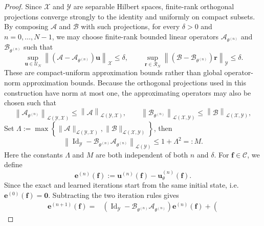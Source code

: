 \documentclass[10pt,a4paper]{amsart}
\begin{document}
\begin{proof}
				{ Since $\mathcal X$ and $\mathcal Y$ are separable Hilbert spaces,
					finite-rank orthogonal projections converge strongly to the identity and
					uniformly on compact subsets. By composing $\mathcal A$ and $\mathcal B$
					with such projections, for every $\delta>0$ and
					$n=0,\ldots,N-1$, we may choose finite-rank bounded linear operators
					$\mathcal A_{\theta^{(n)}}$ and
					$\mathcal B_{\theta^{(n)}}$ such that
					\[
					\sup_{\boldsymbol u\in\mathcal U_N}
					\left\|
					\left(
					\mathcal A-\mathcal A_{\theta^{(n)}}
					\right)\boldsymbol u
					\right\|_{\mathcal X}
					\leq\delta, \qquad
					\sup_{\boldsymbol r\in\mathcal R_N}
					\left\|
					\left(
					\mathcal B-\mathcal B_{\theta^{(n)}}
					\right)\boldsymbol r
					\right\|_{\mathcal Y}
					\leq\delta.
					\]
					These are compact-uniform approximation bounds rather than global
					operator-norm approximation bounds. }
				Because the orthogonal projections used in this construction have norm at
				most one, the approximating operators may also be chosen such that
				\[
				\left\|
				\mathcal A_{\theta^{(n)}}
				\right\|_{\mathcal L(\mathcal Y,\mathcal X)}
				\leq \left\|
				\mathcal A
				\right\|_{\mathcal L(\mathcal Y,\mathcal X)},
				\qquad
				\left\|
				\mathcal B_{\theta^{(n)}}
				\right\|_{\mathcal L(\mathcal X,\mathcal Y)}
				\leq \left\|
				\mathcal B
				\right\|_{\mathcal L(\mathcal X,\mathcal Y)},
				\]
				Set $\Lambda
				:=
				\max
				\left\{
				\|\mathcal A\|_{\mathcal L(\mathcal Y,\mathcal X)},
				\|\mathcal B\|_{\mathcal L(\mathcal X,\mathcal Y)}
				\right\}$, 
				then
				\[
				\left\|
				\operatorname{Id}_{\mathcal Y}
				-
				\mathcal B_{\theta^{(n)}}
				\mathcal A_{\theta^{(n)}}
				\right\|_{\mathcal L(\mathcal Y)}
				\leq
				1+\Lambda^2
				=:M.
				\]
				Here the constants $\Lambda$ and $M$ are both independent of
				both $n$ and $\delta$.
				For $\boldsymbol f\in\mathcal C$, we define
				\[
				\boldsymbol e^{(n)}(\boldsymbol f)
				:=
				\boldsymbol u^{(n)}(\boldsymbol f)
				-
				\boldsymbol u_\theta^{(n)}(\boldsymbol f).
				\]
				Since the exact and learned iterations start from the same initial state, i.e. $\boldsymbol e^{(0)}(\boldsymbol f)=\boldsymbol 0$.
				Subtracting the two iteration rules gives
				\[
				\begin{aligned}
					\boldsymbol e^{(n+1)}(\boldsymbol f)
					={}&
					\left(
					\operatorname{Id}_{\mathcal Y}
					-
					\mathcal B_{\theta^{(n)}}
					\mathcal A_{\theta^{(n)}}
					\right)
					\boldsymbol e^{(n)}(\boldsymbol f)+
					\left(

\end{aligned}\]
\end{proof}
\end{document}
